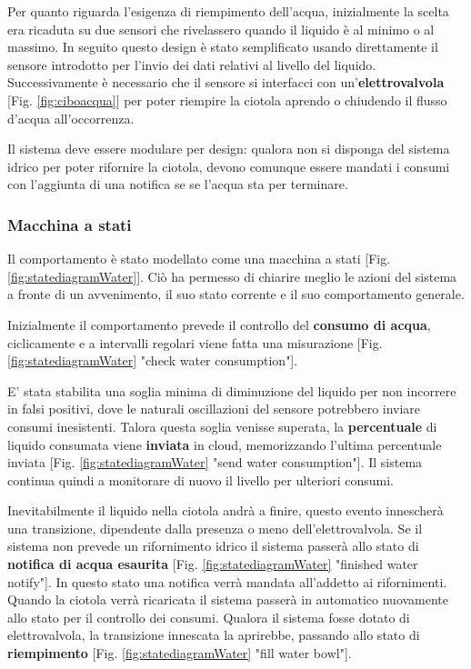     Per quanto riguarda l'esigenza di riempimento dell'acqua, inizialmente la scelta era ricaduta su due sensori che rivelassero quando il liquido è al minimo o al massimo. In seguito questo design è stato semplificato usando direttamente il sensore introdotto per l'invio dei dati relativi al livello del liquido. 
    Successivamente è necessario che il sensore si interfacci con un'\textbf{elettrovalvola} [Fig. \ref{fig:ciboacqua}] per poter riempire la ciotola aprendo o chiudendo il flusso d'acqua all'occorrenza. 
    
    Il sistema deve essere modulare per design: qualora non si disponga del sistema idrico per poter rifornire la ciotola, devono comunque essere mandati i consumi con l'aggiunta di una notifica se se l'acqua sta per terminare.
    
    \subsubsection{Macchina a stati} Il comportamento è stato modellato come una macchina a stati [Fig. \ref{fig:statediagramWater}]. Ciò ha permesso di chiarire meglio le azioni del sistema a fronte di un avvenimento, il suo stato corrente e il suo comportamento generale.
    
    Inizialmente il comportamento prevede il controllo del \textbf{consumo di acqua}, ciclicamente e a intervalli regolari viene fatta una misurazione [Fig. \ref{fig:statediagramWater} "check water consumption"]. 
    
    E' stata stabilita una soglia minima di diminuzione del liquido per non incorrere in falsi positivi, dove le naturali oscillazioni del sensore potrebbero inviare consumi inesistenti. Talora questa soglia venisse superata, la \textbf{percentuale} di liquido consumata viene \textbf{inviata} in cloud, memorizzando l'ultima percentuale inviata [Fig. \ref{fig:statediagramWater} "send water consumption"]. Il sistema continua quindi a monitorare di nuovo il livello per ulteriori consumi. 
    
    Inevitabilmente il liquido nella ciotola andrà a finire, questo evento innescherà una transizione, dipendente dalla presenza o meno dell'elettrovalvola. 
    Se il sistema non prevede un rifornimento idrico il sistema passerà allo stato di \textbf{notifica di acqua esaurita} [Fig. \ref{fig:statediagramWater} "finished water notify"]. In questo stato una notifica verrà mandata all'addetto ai rifornimenti. Quando la ciotola verrà ricaricata il sistema passerà in automatico nuovamente allo stato per il controllo dei consumi.
    Qualora il sistema fosse dotato di elettrovalvola, la transizione innescata la aprirebbe, passando allo stato di \textbf{riempimento} [Fig. \ref{fig:statediagramWater} "fill water bowl"]. 
    
